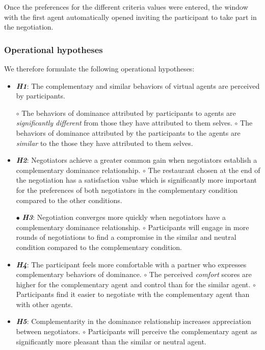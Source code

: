 \documentclass[10pt, a4paper, twocolumn]{article} %
\begin{document}
		Once the preferences for the different criteria values were entered, the window with the first agent automatically opened inviting the participant to take part in the negotiation. 
		
			
			
		\subsubsection{Operational hypotheses}
		We therefore formulate the following operational hypotheses:
		\begin{itemize}
			\item \textit{\textbf{H1}}: The complementary and similar behaviors of virtual agents are perceived by participants.
				
				\subitem $\circ$ The behaviors of dominance attributed by participants to agents are \textit{significantly different} from those they have attributed to them selves.
				\subitem $\circ$ The behaviors of dominance attributed by the participants to the agents are \textit{similar} to the those they have attributed to them selves.
				
				\item \textit{ \textbf{H2}}: Negotiators achieve a greater common gain when negotiators establish a complementary dominance relationship.
					\subitem $\circ$ The restaurant chosen at the end of the negotiation has a satisfaction value which is significantly more important for the preferences of both negotiators in the complementary condition compared to the other conditions. 
					
					\item[$\bullet$] \textit{\textbf{H3}}: Negotiation converges more quickly when negotiators have a complementary dominance relationship.
						\subitem $\circ$ Participants will engage in more rounds of negotiations to find a compromise in the similar and neutral condition compared to the complementary condition.
						
					\item \textit{\textbf{H4}}: The participant feels more comfortable with a partner who expresses complementary behaviors of dominance.
						\subitem $\circ$ The perceived \emph{comfort} scores are higher for the complementary agent and control than for the similar agent.
						\subitem $\circ$ Participants find it easier to negotiate with the complementary agent than with other agents.
						
					\item \textit{\textbf{H5}}: Complementarity in the dominance relationship increases appreciation between negotiators.
						\subitem $\circ$ Participants will perceive the complementary agent as significantly more pleasant than the similar or neutral agent.
								
		\end{itemize}
		
\end{document}
